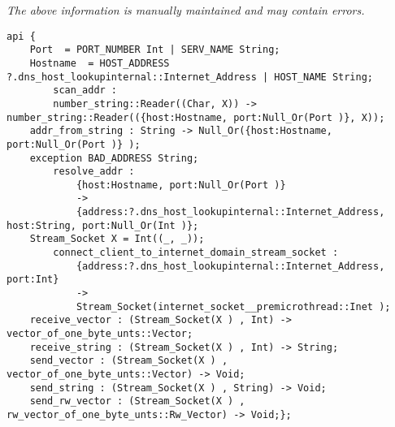 \label{api:Socket\_Junk}

{\tiny \it The above information is manually maintained and may contain errors.}
\begin{verbatim}
api {
    Port  = PORT_NUMBER Int | SERV_NAME String;
    Hostname  = HOST_ADDRESS ?.dns_host_lookupinternal::Internet_Address | HOST_NAME String;
        scan_addr :
        number_string::Reader((Char, X)) -> number_string::Reader(({host:Hostname, port:Null_Or(Port )}, X));
    addr_from_string : String -> Null_Or({host:Hostname, port:Null_Or(Port )} );
    exception BAD_ADDRESS String;
        resolve_addr :
            {host:Hostname, port:Null_Or(Port )}
            ->
            {address:?.dns_host_lookupinternal::Internet_Address, host:String, port:Null_Or(Int )};
    Stream_Socket X = Int((_, _));
        connect_client_to_internet_domain_stream_socket :
            {address:?.dns_host_lookupinternal::Internet_Address, port:Int}
            ->
            Stream_Socket(internet_socket__premicrothread::Inet );
    receive_vector : (Stream_Socket(X ) , Int) -> vector_of_one_byte_unts::Vector;
    receive_string : (Stream_Socket(X ) , Int) -> String;
    send_vector : (Stream_Socket(X ) , vector_of_one_byte_unts::Vector) -> Void;
    send_string : (Stream_Socket(X ) , String) -> Void;
    send_rw_vector : (Stream_Socket(X ) , rw_vector_of_one_byte_unts::Rw_Vector) -> Void;};
\end{verbatim}
